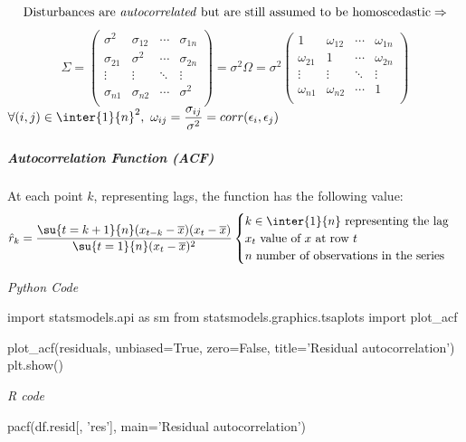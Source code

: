 $$ \text{Disturbances are \emph{autocorrelated} but are still assumed to be homoscedastic}
\Rightarrow $$
\begin{equation*}
	\Sigma=
	\begin{pmatrix}
		\sigma^{2} & \sigma_{12} & \cdots & \sigma_{1n}\\
		\sigma_{21} & \sigma^{2} & \cdots & \sigma_{2n}\\
		\vdots & \vdots & \ddots & \vdots\\
		\sigma_{n1} & \sigma_{n2} & \cdots & \sigma^{2}\\
	\end{pmatrix}
	= \sigma^{2}\Omega = \sigma^{2}
	\begin{pmatrix}
		1 & \omega_{12} & \cdots & \omega_{1n}\\
		\omega_{21} & 1 & \cdots & \omega_{2n}\\
		\vdots & \vdots & \ddots & \vdots\\
		\omega_{n1} & \omega_{n2} & \cdots & 1\\
	\end{pmatrix}
\end{equation*}
$\forall(i,j)\in\inter{1}{n}^{2},~\omega_{ij}=\dfrac{\sigma_{ij}}{\sigma^{2}}=corr(\epsilon_{i},
\epsilon_{j})$
\subparagraph{Autocorrelation Function (ACF)}
At each point $k$, representing lags, the function has the following value:
$$ \hat{r}_{k}=\dfrac{\su{{t=k+1}}{n}(x_{t-k}-\overline{x})(x_{t}-\overline{x})}{\su{{t=1}}{n}
(x_{t}-\overline{x})^{2}}
\begin{cases}
	k\in\inter{1}{n}\text{ representing the lag}\\
	x_{t}\text{ value of }x\text{ at row }t\\
	n\text{ number of observations in the series}
\end{cases}
$$

\emph{Python Code}
\begin{python}
import statsmodels.api as sm
from statsmodels.graphics.tsaplots import plot_acf

plot_acf(residuals, unbiased=True, zero=False,
    title='Residual autocorrelation')
plt.show()
\end{python}

\emph{R code}
\begin{rcode}[deletekeywords={df, resid}]
pacf(df.resid[, 'res'], main='Residual autocorrelation')
\end{rcode}


